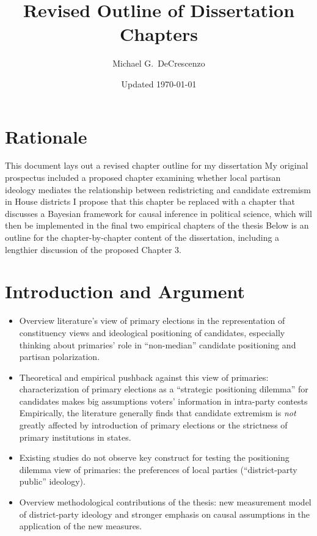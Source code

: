 \documentclass[12pt
              ]{article}
\begin{document}
\title{Revised Outline of Dissertation Chapters}
\author{Michael G.\ DeCrescenzo}
\date{Updated \today}
\maketitle


\section*{Rationale}

This document lays out a revised chapter outline for my dissertation
My original prospectus included a proposed chapter examining whether local partisan ideology mediates the relationship between redistricting and candidate extremism in House districts
I propose that this chapter be replaced with a chapter that discusses a Bayesian framework for causal inference in political science, which will then be implemented in the final two empirical chapters of the thesis
Below is an outline for the chapter-by-chapter content of the dissertation, including a lengthier discussion of the proposed Chapter 3.



\section{Introduction and Argument}

\begin{itemize}
  \item Overview literature's view of primary elections in the representation of constituency views and ideological positioning of candidates, especially thinking about primaries' role in ``non-median'' candidate positioning and partisan polarization.
  \item Theoretical and empirical pushback against this view of primaries: characterization of primary elections as a ``strategic positioning dilemma'' for candidates makes big assumptions voters' information in intra-party contests
  Empirically, the literature generally finds that candidate extremism is \emph{not} greatly affected by introduction of primary elections or the strictness of primary institutions in states.
  \item Existing studies do not observe key construct for testing the positioning dilemma view of primaries: the preferences of local parties (``district-party public'' ideology).
  \item Overview methodological contributions of the thesis: new measurement model of district-party ideology and stronger emphasis on causal assumptions in the application of the new measures.
\end{itemize}
\end{document}
